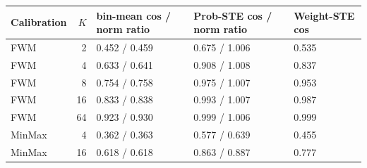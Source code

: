 \begin{tabular}{lrlll}
\toprule
Calibration & $K$ & bin-mean cos / norm ratio & Prob-STE cos / norm ratio & Weight-STE cos \\
\midrule
FWM & 2 & 0.452 / 0.459 & 0.675 / 1.006 & 0.535 \\
FWM & 4 & 0.633 / 0.641 & 0.908 / 1.008 & 0.837 \\
FWM & 8 & 0.754 / 0.758 & 0.975 / 1.007 & 0.953 \\
FWM & 16 & 0.833 / 0.838 & 0.993 / 1.007 & 0.987 \\
FWM & 64 & 0.923 / 0.930 & 0.999 / 1.006 & 0.999 \\
MinMax & 4 & 0.362 / 0.363 & 0.577 / 0.639 & 0.455 \\
MinMax & 16 & 0.618 / 0.618 & 0.863 / 0.887 & 0.777 \\
\bottomrule
\end{tabular}
